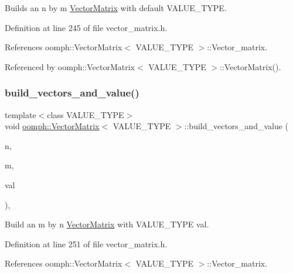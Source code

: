 Builds an n by m \hyperlink{classoomph_1_1VectorMatrix}{Vector\+Matrix} with default V\+A\+L\+U\+E\+\_\+\+T\+Y\+PE. 



Definition at line 245 of file vector\+\_\+matrix.\+h.



References oomph\+::\+Vector\+Matrix$<$ V\+A\+L\+U\+E\+\_\+\+T\+Y\+P\+E $>$\+::\+Vector\+\_\+matrix.



Referenced by oomph\+::\+Vector\+Matrix$<$ V\+A\+L\+U\+E\+\_\+\+T\+Y\+P\+E $>$\+::\+Vector\+Matrix().

\mbox{\label{classoomph_1_1VectorMatrix_a23f3efbe283e626a815be17878dc8014}} 
\subsubsection{\texorpdfstring{build\+\_\+vectors\+\_\+and\+\_\+value()}{build\_vectors\_and\_value()}}
{\footnotesize\ttfamily template$<$class V\+A\+L\+U\+E\+\_\+\+T\+Y\+PE$>$ \\
void \hyperlink{classoomph_1_1VectorMatrix}{oomph\+::\+Vector\+Matrix}$<$ V\+A\+L\+U\+E\+\_\+\+T\+Y\+PE $>$\+::build\+\_\+vectors\+\_\+and\+\_\+value (\begin{DoxyParamCaption}\item[{const unsigned \&}]{n,  }\item[{const unsigned \&}]{m,  }\item[{const V\+A\+L\+U\+E\+\_\+\+T\+Y\+PE \&}]{val }\end{DoxyParamCaption})\hspace{0.3cm}{\ttfamily [inline]}, {\ttfamily [protected]}}



Build an m by n \hyperlink{classoomph_1_1VectorMatrix}{Vector\+Matrix} with V\+A\+L\+U\+E\+\_\+\+T\+Y\+PE val. 



Definition at line 251 of file vector\+\_\+matrix.\+h.



References oomph\+::\+Vector\+Matrix$<$ V\+A\+L\+U\+E\+\_\+\+T\+Y\+P\+E $>$\+::\+Vector\+\_\+matrix.



